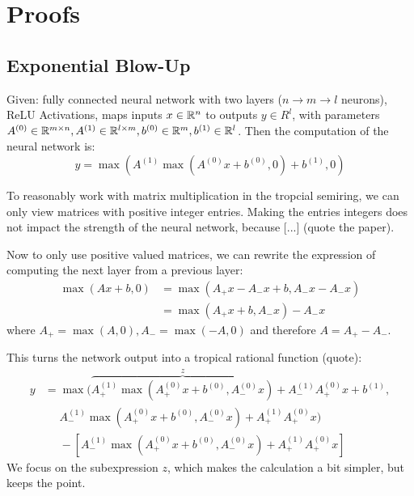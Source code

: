 \chapter{Proofs}
\label{chap:proofs}

\section{Exponential Blow-Up}

Given: fully connected neural network with two layers ($n \rightarrow m \rightarrow l$ neurons), ReLU Activations, maps inputs $x \in \mathbb{R}^n$ to outputs $y \in R^l$, with parameters $A^{(0)} \in \mathbb{R}^{m \times n}, A^{(1)} \in \mathbb{R}^{l \times m}, b^{(0)} \in \mathbb{R}^m, b^{(1)} \in \mathbb{R}^l$.
Then the computation of the neural network is:
$$y = \max(A^{(1)}\max(A^{(0)}x + b^{(0)}, 0) + b^{(1)}, 0)$$

To reasonably work with matrix multiplication in the tropcial semiring, we can only view matrices with positive integer entries.
Making the entries integers does not impact the strength of the neural network, because [...] (quote the paper).

Now to only use positive valued matrices, we can rewrite the expression of computing the next layer from a previous layer:
\begin{align*}
    \max(Ax + b, 0) & = \max(A_+ x - A_- x + b, A_- x - A_- x) \\
                    & = \max(A_+ x + b, A_- x) - A_- x
\end{align*}
where $A_+ = \max(A, 0), A_- = \max(-A, 0)$ and therefore $A = A_+ - A_-$.

This turns the network output into a tropical rational function (quote):
\begin{align*}
    y & = \max(\overbrace{A^{(1)}_+ \max(A^{(0)}_+ x + b^{(0)}, A^{(0)}_- x)}^z + A^{(1)}_- A^{(0)}_+ x + b^{(1)}, \\
      & \phantom{{} =} A^{(1)}_- \max(A^{(0)}_+ x + b^{(0)}, A^{(0)}_- x) + A^{(1)}_+ A^{(0)}_+ x)                 \\
      & \phantom{{} =} -\left[A^{(1)}_- \max(A^{(0)}_+ x + b^{(0)}, A^{(0)}_- x) + A^{(1)}_+ A^{(0)}_+ x\right]
\end{align*}
We focus on the subexpression $z$, which makes the calculation a bit simpler, but keeps the point.

